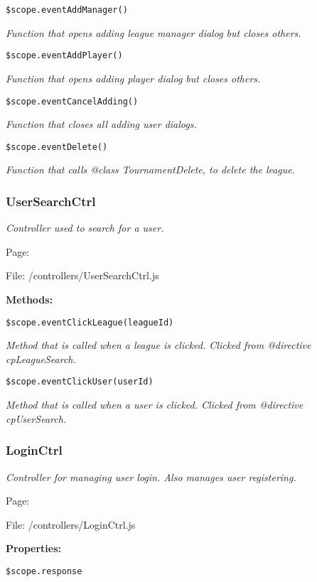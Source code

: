 \texttt{\$scope.eventAddManager()}

{\scriptsize
\textit{Function that opens adding league manager dialog but closes others.}

}

\texttt{\$scope.eventAddPlayer()}

{\scriptsize
\textit{Function that opens adding player dialog but closes others.}

}

\texttt{\$scope.eventCancelAdding()}

{\scriptsize
\textit{Function that closes all adding user dialogs.}

}

\texttt{\$scope.eventDelete()}

{\scriptsize
\textit{Function that calls @class TournamentDelete, to delete the league.}

}

\subsubsection{UserSearchCtrl}\label{UserSearchCtrl.js.doc}
\textit{Controller used to search for a user.}

Page: \pageref{UserSearchCtrl.js}

File: /controllers/UserSearchCtrl.js

\textbf{Methods:}

\texttt{\$scope.eventClickLeague(leagueId)}

{\scriptsize
\textit{Method that is called when a league is clicked.
Clicked from @directive cpLeagueSearch.}

}

\texttt{\$scope.eventClickUser(userId)}

{\scriptsize
\textit{Method that is called when a user is clicked.
Clicked from @directive cpUserSearch.}

}

\subsubsection{LoginCtrl}\label{LoginCtrl.js.doc}
\textit{Controller for managing user login.
Also manages user registering.}

Page: \pageref{LoginCtrl.js}

File: /controllers/LoginCtrl.js

\textbf{Properties:}

\texttt{\$scope.response}

